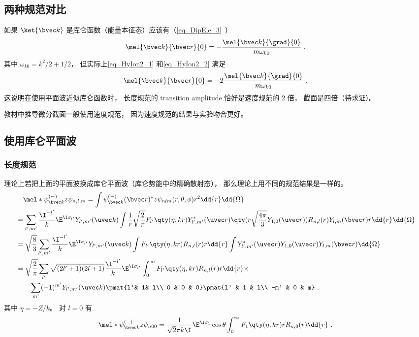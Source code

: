\subsection{两种规范对比}
如果 $\ket{\bvec k}$ 是库仑函数（能量本征态）应该有（\autoref{eq_DipEle_3}~）
\begin{equation}
\mel{\bvec k}{\bvec r}{0} = -\frac{\mel{\bvec k}{\grad}{0}}{m\omega_{k0}}~.
\end{equation}
其中 $\omega_{k0} = k^2/2 + 1/2$， 但实际上\autoref{eq_HyIon2_1} 和\autoref{eq_HyIon2_2} 满足
\begin{equation}
\mel{\bvec k}{\bvec r}{0} = -2\frac{\mel{\bvec k}{\grad}{0}}{m\omega_{k0}}~.
\end{equation}
这说明在使用平面波近似库仑函数时， 长度规范的 transition amplitude 恰好是速度规范的 2 倍， 截面是四倍（待求证）。

教材中推导微分截面一般使用速度规范， 因为速度规范的结果与实验吻合更好。

\subsection{使用库仑平面波}
\subsubsection{长度规范}

理论上若把上面的平面波换成库仑平面波（库仑势能中的精确散射态）， 那么理论上用不同的规范结果是一样的。
\begin{equation}
\begin{aligned}
&\quad\mel*{\psi_{\bvec k}^{(-)}}{z}{\psi_{n,l,m}} = \int \psi_{\bvec k}^{(-)}(\bvec r)^* z \psi_{nlm}(r,\theta,\phi) r^2 \dd{r}\dd{\Omega}\\
&= \sum_{l',m'} \frac{\I^{-l'}}{k} \E^{\I\sigma_{l'}} Y_{l',m'}(\uvec k) \int \frac{1}{r} \sqrt{\frac{2}{\pi}} F_{l'}\qty(\eta, kr) Y_{l',m'}^*(\uvec r) \qty(r \sqrt{\frac{4\pi}{3}} Y_{1,0}(\uvec r))R_{n,l}(r) Y_{l,m}(\bvec r) r \dd{r}\dd{\Omega}\\
&= \sqrt{\frac{8}{3}}\sum_{l',m'} \frac{\I^{-l'}}{k} \E^{\I\sigma_{l'}} Y_{l',m'}(\uvec k) \int F_{l'}\qty(\eta, kr) R_{n,l}(r) r \dd{r} \int Y_{l',m'}^*(\uvec r)Y_{1,0}(\uvec r)Y_{l,m}(\bvec r) \dd{\Omega}\\
&= \sqrt{\frac{2}{\pi}} \sum_{l'} \sqrt{(2l'+1)(2l+1)} \frac{\I^{-l'}}{k} \E^{\I\sigma_{l'}} \int_0^\infty F_{l'}\qty(\eta, kr) R_{n,l}(r) r\dd{r}\times\\
& \qquad \sum_{m'}  (-1)^{m'} Y_{l',m'}(\uvec k) \pmat{l'& 1& l\\ 0 & 0 & 0}\pmat{l' & 1 & l\\  -m' & 0 & m}~.
\end{aligned}
\end{equation}
其中 $\eta = -Z/k$。 对 $l=0$ 有
\begin{equation}
\mel*{\psi_{\bvec k}^{(-)}}{z}{\psi_{n00}} = \frac{1}{\sqrt{2}\pi k\I} \E^{\I\sigma_1} \cos\theta \int_0^\infty F_1\qty(\eta, kr) rR_{n,0}(r) \dd{r}~.
\end{equation}


